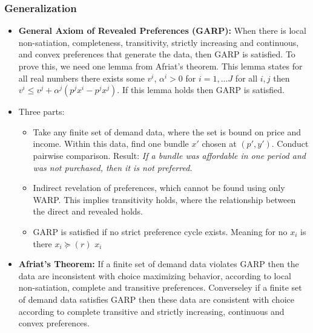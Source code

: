 \documentclass{article}
\begin{document}
\subsubsection{Generalization}
\begin{itemize}
    \item \textbf{General Axiom of Revealed Preferences (GARP):} When there is local non-satiation, completeness, transitivity, strictly increasing and continuous, and convex preferences that generate the data, then GARP is satisfied. To prove this, we need one lemma from Afriat's theorem. This lemma states for all real numbers there exists some $v^i$, $\alpha^i > 0$ for $i=1,...J$ for all $i, j$ then $v^i \leq v^j + \alpha^j(p^jx^i - p^jx^j)$. If this lemma holds then GARP is satisfied. 
    \item Three parts:
    \begin{itemize}
        \item Take any finite set of demand data, where the set is bound on price and income. Within this data, find one bundle $x'$ chosen at $(p',y')$. Conduct pairwise comparison. Result: \textit{If a bundle was affordable in one period and was not purchased, then it is not preferred.}
        \item Indirect revelation of preferences, which cannot be found using only WARP. This implies transitivity holds, where the relationship between the direct and revealed holds. 
        \item GARP is satisfied if no strict preference cycle exists. Meaning for no $x_i$ is there $x_i \succeq(r)$ $ x_i$
    \end{itemize}
    \item \textbf{Afriat's Theorem:} If a finite set of demand data violates GARP then the data are inconsistent with choice maximizing behavior, according to local non-satiation, complete and transitive preferences. Converseley if a finite set of demand data satisfies GARP then these data are consistent with choice according to complete transitive and strictly increasing, continuous and convex preferences.  
\end{itemize}


\end{document}
